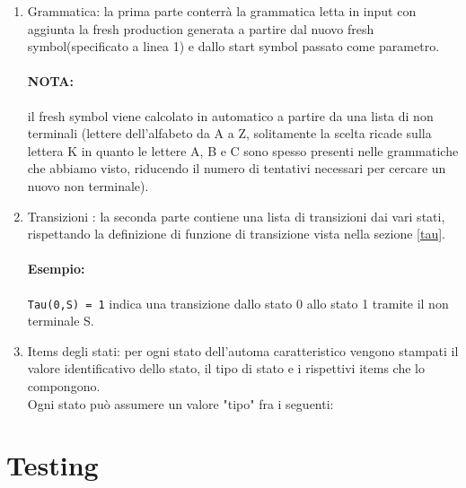 \documentclass[12pt]{article}
\begin{document}
\begin{enumerate}
\item Grammatica: la prima parte conterrà la grammatica letta in input con aggiunta la fresh production generata a partire dal nuovo fresh symbol(specificato a linea 1) e dallo start symbol passato come parametro.

\paragraph{NOTA:}il fresh symbol viene calcolato in automatico a partire da una lista di non terminali (lettere dell'alfabeto da A a Z, solitamente la scelta ricade sulla lettera K in quanto le lettere A, B e C sono spesso presenti nelle grammatiche che abbiamo visto, riducendo il numero di tentativi necessari per cercare un nuovo non terminale).

\item Transizioni : la seconda parte contiene una lista di transizioni dai vari stati, rispettando la definizione di funzione di transizione vista nella sezione \ref{tau}.
\paragraph{Esempio: } \texttt{Tau(0,S) = 1} indica una transizione dallo stato 0 allo stato 1 tramite il non terminale S.

\item Items degli stati: per ogni stato dell'automa caratteristico vengono stampati il valore identificativo dello stato, il tipo di stato e i rispettivi items che lo compongono. \\

Ogni stato può assumere un valore "tipo" fra i seguenti:

\end{enumerate}


\section{Testing}
\end{document}
